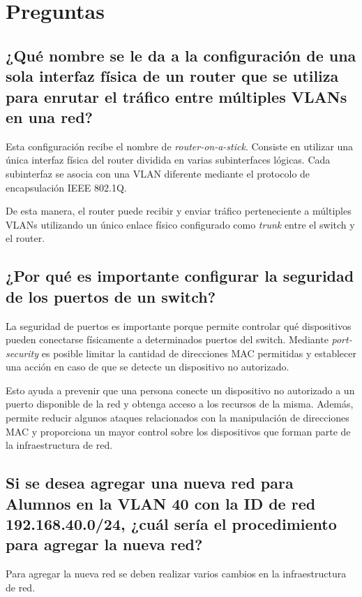 \documentclass[12pt]{article}
\begin{document}
\section{Preguntas}

\subsection{¿Qué nombre se le da a la configuración de una sola interfaz física
de un router que se utiliza para enrutar el tráfico entre múltiples VLANs
en una red?}

Esta configuración recibe el nombre de \textit{router-on-a-stick}. Consiste
en utilizar una única interfaz física del router dividida en varias
subinterfaces lógicas. Cada subinterfaz se asocia con una VLAN diferente
mediante el protocolo de encapsulación IEEE 802.1Q.

De esta manera, el router puede recibir y enviar tráfico perteneciente a
múltiples VLANs utilizando un único enlace físico configurado como
\textit{trunk} entre el switch y el router.


\subsection{¿Por qué es importante configurar la seguridad de los puertos
de un switch?}

La seguridad de puertos es importante porque permite controlar qué
dispositivos pueden conectarse físicamente a determinados puertos del
switch. Mediante \textit{port-security} es posible limitar la cantidad de
direcciones MAC permitidas y establecer una acción en caso de que se detecte
un dispositivo no autorizado.

Esto ayuda a prevenir que una persona conecte un dispositivo no autorizado
a un puerto disponible de la red y obtenga acceso a los recursos de la misma.
Además, permite reducir algunos ataques relacionados con la manipulación de
direcciones MAC y proporciona un mayor control sobre los dispositivos que
forman parte de la infraestructura de red.


\subsection{Si se desea agregar una nueva red para Alumnos en la VLAN 40 con
la ID de red 192.168.40.0/24, ¿cuál sería el procedimiento para agregar la
nueva red?}

Para agregar la nueva red se deben realizar varios cambios en la
infraestructura de red.
\end{document}
